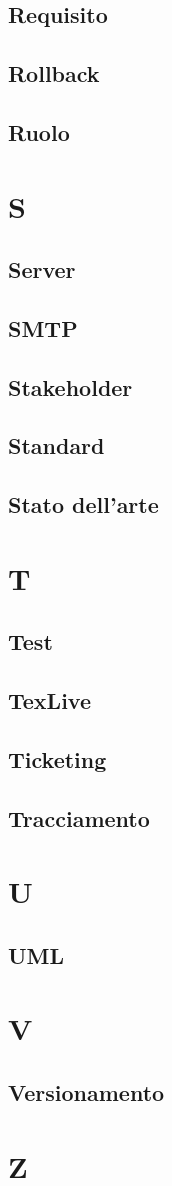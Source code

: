 \documentclass[12pt]{article}
\begin{document}
		\subsection{Requisito}
		\subsection{Rollback}
		\subsection{Ruolo}
	\clearpage
	\section{S}
		\subsection{Server}
		\subsection{SMTP}
		\subsection{Stakeholder}
		\subsection{Standard}
		\subsection{Stato dell'arte}
	\clearpage
	\section{T}
		\subsection{Test}
		\subsection{TexLive}
		\subsection{Ticketing}
		\subsection{Tracciamento}
	\clearpage
	\section{U}
		\subsection{UML}
	\clearpage
	\section{V}
		\subsection{Versionamento}
	\clearpage
	\section{Z}	
\end{document}
